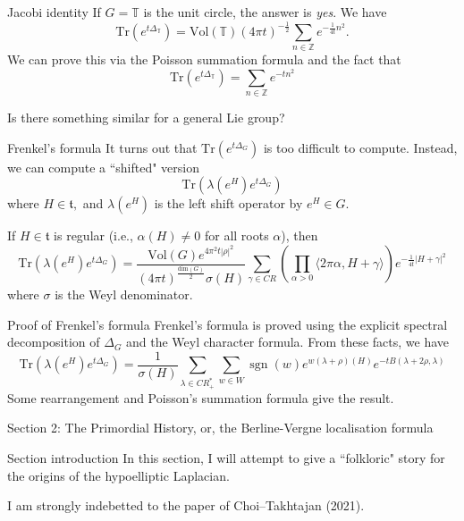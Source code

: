 \documentclass{beamer}
\numberwithin{equation}{section}
\theoremstyle{plain}
\theoremstyle{plain}
\theoremstyle{definition}
\theoremstyle{plain}
\theoremstyle{plain}
\theoremstyle{definition}
\newcommand{\Itgr}{\mathbb{Z}}
\newcommand{\Circ}{\mathbb{T}}
\newcommand{\Tr}{\mathrm{Tr}}
\newcommand{\sgn}{\operatorname{sgn}}
\newcommand{\tf}{\mathfrak{t}}
\begin{document}
\begin{frame}{Jacobi identity}
  If $G = \Circ$ is the unit circle, the answer is \emph{yes}. We have
  \[
    \Tr(e^{t\Delta_{\Circ}}) = \mathrm{Vol}(\Circ)(4\pi t)^{-\frac12}\sum_{n\in \Itgr} e^{-\frac{1}{4t}n^2}.
  \]
  We can prove this via the Poisson summation formula and the fact that
  \[
    \Tr(e^{t\Delta_{\Circ}}) = \sum_{n\in \Itgr} e^{-tn^2}
  \]
  
  
  Is there something similar for a general Lie group?
\end{frame}

\begin{frame}{Frenkel's formula}
  It turns out that $\Tr(e^{t\Delta_G})$ is too difficult to compute. Instead, we can compute a ``shifted" version
  \[
    \Tr(\lambda(e^H)e^{t\Delta_G})
  \]
  where $H\in \tf,$ and $\lambda(e^H)$ is the left shift operator by $e^H\in G.$
  \begin{theorem}[Frenkel (1984)]
      If $H\in \tf$ is regular (i.e., $\alpha(H)\neq 0$ for all roots $\alpha$), then
      \[
          \Tr(\lambda(e^H)e^{t\Delta_G}) = \frac{\mathrm{Vol}(G)e^{4\pi^2t|\rho|^2}}{(4\pi t)^{\frac{\mathrm{dim}(G)}{2}}\sigma(H)}\sum_{\gamma \in CR} \left(\prod_{\alpha>0} \langle 2\pi \alpha,H+\gamma\rangle\right) e^{-\frac{1}{4t}|H+\gamma|^2} 
      \]
      where $\sigma$ is the Weyl denominator.
  \end{theorem}
\end{frame}

\begin{frame}{Proof of Frenkel's formula}
    Frenkel's formula is proved using the explicit spectral decomposition of $\Delta_G$ and the Weyl character formula. From these facts, we have
    \[
      \Tr(\lambda(e^H)e^{t\Delta_G}) = \frac{1}{\sigma(H)}\sum_{\lambda \in CR^*_+} \sum_{w \in W} \sgn(w)e^{w(\lambda+\rho)(H)}e^{-tB(\lambda+2\rho,\lambda)}
    \]
    Some rearrangement and Poisson's summation formula give the result.
\end{frame}


\begin{frame}
    \huge{Section 2: The Primordial History, or, the Berline-Vergne localisation formula}
\end{frame}

\begin{frame}{Section introduction}
  In this section, I will attempt to give a ``folkloric" story for the origins of the hypoelliptic Laplacian.
  
  I am strongly indebetted to the paper of Choi--Takhtajan (2021).
\end{frame}
\end{document}
